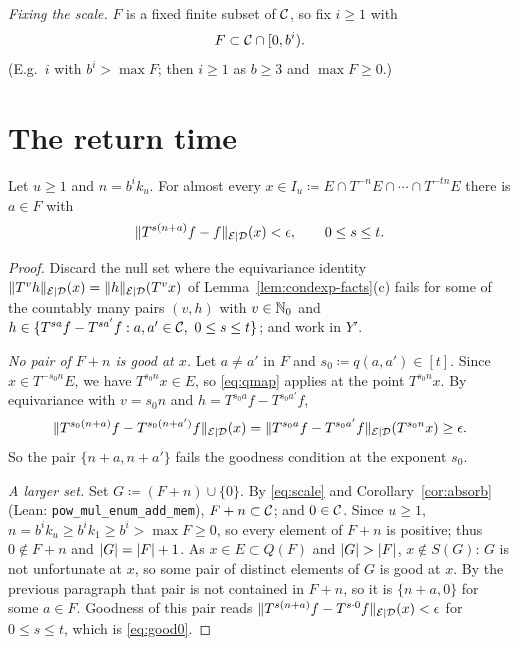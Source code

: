 \emph{Fixing the scale.}  $F$ is a fixed finite subset of $\mathcal{C}$, so fix $i \geq 1$ with
\begin{equation}
  \label{eq:scale}
  F \subset \mathcal{C} \cap [0, b^i) .
\end{equation}
(E.g.\ $i$ with $b^i > \max F$; then $i \geq 1$ as $b \geq 3$ and $\max F \geq 0$.)

\section{The return time}

\begin{lemma}
  \label{lem:return-time}
  \leanok
  Let $u \geq 1$ and $n = b^i k_u$.  For almost every
  $x \in I_u \coloneqq E \cap T^{-n}E \cap \cdots \cap T^{-tn}E$ there is $a \in F$ with
  \begin{equation}
    \label{eq:good0}
    \lVert T^{s(n+a)}f - f \rVert_{\mathcal{E} \mid \mathcal{D}}(x) < \epsilon , \qquad 0 \leq s \leq t .
  \end{equation}
\end{lemma}

\begin{proof}
  Discard the null set where the equivariance identity
  $\lVert T^{v}h \rVert_{\mathcal{E} \mid \mathcal{D}}(x) = \lVert h \rVert_{\mathcal{E} \mid \mathcal{D}}(T^{v}x)$ of Lemma~\ref{lem:condexp-facts}(c) fails for some
  of the countably many pairs $(v, h)$ with $v \in \mathbb{N}_0$ and
  $h \in \{T^{sa}f - T^{sa'}f : a,a' \in \mathcal{C},\ 0 \leq s \leq t\}$; and work in $Y'$.

  \emph{No pair of $F + n$ is good at $x$.}  Let $a \neq a'$ in $F$ and $s_0 \coloneqq q(a,a') \in [t]$.
  Since $x \in T^{-s_0n}E$, we have $T^{s_0n}x \in E$, so \eqref{eq:qmap} applies at the point
  $T^{s_0n}x$.  By equivariance with $v = s_0n$ and $h = T^{s_0a}f - T^{s_0a'}f$,
  \[
    \lVert T^{s_0(n+a)}f - T^{s_0(n+a')}f \rVert_{\mathcal{E} \mid \mathcal{D}}(x)
      = \lVert T^{s_0a}f - T^{s_0a'}f \rVert_{\mathcal{E} \mid \mathcal{D}}(T^{s_0n}x) \geq \epsilon .
  \]
  So the pair $\{n+a, n+a'\}$ fails the goodness condition at the exponent $s_0$.

  \emph{A larger set.}  Set $G \coloneqq (F+n) \cup \{0\}$.  By \eqref{eq:scale} and
  Corollary~\ref{cor:absorb} (Lean: \texttt{pow\_mul\_enum\_add\_mem}), $F + n \subset \mathcal{C}$;
  and $0 \in \mathcal{C}$.  Since $u \geq 1$, $n = b^ik_u \geq b^i k_1 \geq b^i > \max F \geq 0$, so
  every element of $F+n$ is positive; thus $0 \notin F+n$ and $\lvert G \rvert = \lvert F \rvert + 1$.  As
  $x \in E \subset Q(F)$ and $\lvert G \rvert > \lvert F \rvert$, $x \notin S(G)$: $G$ is not unfortunate at
  $x$, so some pair of distinct elements of $G$ is good at $x$.  By the previous paragraph that
  pair is not contained in $F + n$, so it is $\{n+a, 0\}$ for some $a \in F$.  Goodness of this
  pair reads $\lVert T^{s(n+a)}f - T^{s\cdot 0}f \rVert_{\mathcal{E} \mid \mathcal{D}}(x) < \epsilon$ for $0 \leq s \leq t$, which is
  \eqref{eq:good0}.
\end{proof}

